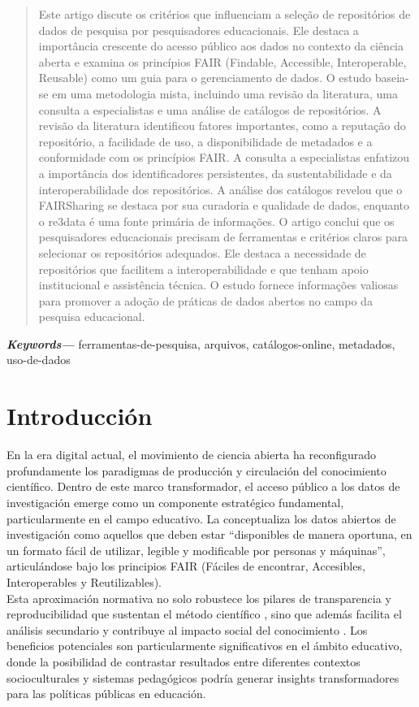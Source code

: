 \documentclass[runningheads]{llncs}
\providecommand{\keywords}[1]
{
  \small	
  \textbf{\textit{Keywords---}} #1
}
\begin{document}
\begin{abstract}
Este artigo discute os critérios que influenciam a seleção de repositórios de dados de pesquisa por pesquisadores educacionais. Ele destaca a importância crescente do acesso público aos dados no contexto da ciência aberta e examina os princípios FAIR (Findable, Accessible, Interoperable, Reusable) como um guia para o gerenciamento de dados. O estudo baseia-se em uma metodologia mista, incluindo uma revisão da literatura, uma consulta a especialistas e uma análise de catálogos de repositórios.
A revisão da literatura identificou fatores importantes, como a reputação do repositório, a facilidade de uso, a disponibilidade de metadados e a conformidade com os princípios FAIR. A consulta a especialistas enfatizou a importância dos identificadores persistentes, da sustentabilidade e da interoperabilidade dos repositórios. A análise dos catálogos revelou que o FAIRSharing se destaca por sua curadoria e qualidade de dados, enquanto o re3data é uma fonte primária de informações.
O artigo conclui que os pesquisadores educacionais precisam de ferramentas e critérios claros para selecionar os repositórios adequados. Ele destaca a necessidade de repositórios que facilitem a interoperabilidade e que tenham apoio institucional e assistência técnica. O estudo fornece informações valiosas para promover a adoção de práticas de dados abertos no campo da pesquisa educacional.
\end{abstract}
\keywords{ferramentas-de-pesquisa, arquivos, catálogos-online, metadados, uso-de-dados}


\section{Introducción}
\label{intro}
En la era digital actual, el movimiento de ciencia abierta ha reconfigurado profundamente los paradigmas de producción y circulación del conocimiento científico. Dentro de este marco transformador, el acceso público a los datos de investigación emerge como un componente estratégico fundamental, particularmente en el campo educativo. La \citet[p.~10]{unesco2021} conceptualiza los datos abiertos de investigación como aquellos que deben estar ``disponibles de manera oportuna, en un formato fácil de utilizar, legible y modificable por personas y máquinas'', articulándose bajo los principios FAIR (Fáciles de encontrar, Accesibles, Interoperables y Reutilizables).\\

Esta aproximación normativa no solo robustece los pilares de transparencia y reproducibilidad que sustentan el método científico \cite{oecd2020}, sino que además facilita el análisis secundario y contribuye al impacto social del conocimiento \citep{ec2016, wilkinson2016}. Los beneficios potenciales son particularmente significativos en el ámbito educativo, donde la posibilidad de contrastar resultados entre diferentes contextos socioculturales y sistemas pedagógicos podría generar insights transformadores para las políticas públicas en educación.\\
\end{document}
